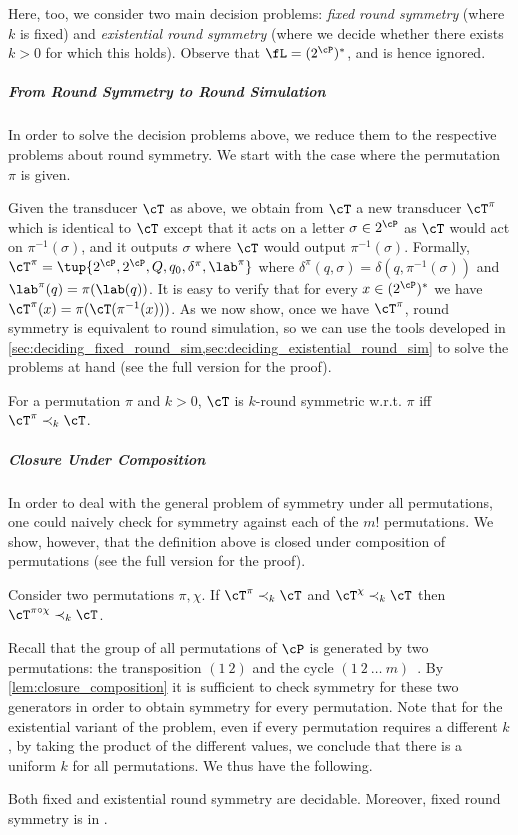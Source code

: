 Here, too, we consider two main decision problems: \emph{fixed round symmetry} (where $k$ is fixed) and \emph{existential round symmetry} (where we decide whether there exists $k>0$ for which this holds). Observe that $\fL=(2^{\cP})^*$, and is hence ignored.

\subparagraph*{From Round Symmetry to Round Simulation}
In order to solve the decision problems above, we reduce them to the respective problems about round symmetry. We start with the case where the permutation $\pi$ is given.

Given the transducer $\cT$ as above, we obtain from $\cT$ a new transducer $\cT^\pi$ which is identical to $\cT$ except that it acts on a letter $\sigma\in 2^\cP$ as $\cT$ would act on $\pi^{-1}(\sigma)$, and it outputs $\sigma$ where $\cT$ would output $\pi^{-1}(\sigma)$. Formally, $\cT^{\pi}=\tup{2^\cP,2^\cP,Q,q_0,\delta^{\pi},\lab^{\pi}}$ where $\delta^{\pi}(q,\sigma)=\delta(q,\pi^{-1}(\sigma))$ and $\lab^{\pi}(q)=\pi(\lab(q))$. It is easy to verify that for every $x\in (2^{\cP})^*$ we have $\cT^\pi(x) = \pi(\cT(\pi^{-1}(x)))$.
As we now show, once we have $\cT^\pi$, round symmetry is equivalent to round simulation, so we can use the tools developed in \cref{sec:deciding_fixed_round_sim,sec:deciding_existential_round_sim} to solve the problems at hand (see the full version for the proof).
\begin{lemma}
    \label{lem:symmetry_to_simulation}
    For a permutation $\pi$ and $k>0$, $\cT$ is $k$-round symmetric w.r.t.\! $\pi$ iff $\cT^{\pi}\prec_k \cT$.
\end{lemma}

\subparagraph*{Closure Under Composition}
In order to deal with the general problem of symmetry under all permutations, one could naively check for symmetry against each of the $m!$ permutations. We show, however, that the definition above is closed under composition of permutations (see the full version for the proof). 
\begin{lemma}
    \label{lem:closure_composition}
    Consider two permutations $\pi,\chi$. If $\cT^\pi\prec_k \cT$ and $\cT^\chi \prec_k \cT$ then $\cT^{\pi\circ \chi} \prec_k \cT$.
\end{lemma}

Recall that the group of all permutations of $\cP$ is generated by two permutations: the transposition $(1\ 2)$ and the cycle $(1\ 2\ \ldots\ m)$~\cite{Cameron1999}. By \cref{lem:closure_composition} it is sufficient to check symmetry for these two generators in order to obtain symmetry for every permutation. Note that for the existential variant of the problem, even if every permutation requires a different $k$, by taking the product of the different values, we conclude that there is a uniform $k$ for all permutations.
We thus have the following.
\begin{theorem}
\label{thm:symmetry_decidable}
Both fixed and existential round symmetry are decidable. Moreover, fixed round symmetry is in \PSPACE.
\end{theorem}

